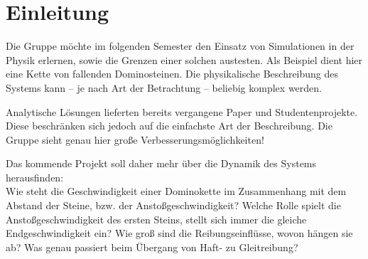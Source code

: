 \section{Einleitung}
Die Gruppe möchte im folgenden Semester den Einsatz von Simulationen in der
Physik erlernen, sowie die Grenzen einer solchen austesten. Als Beispiel dient
hier eine Kette von fallenden Dominosteinen. Die physikalische Beschreibung des
Systems kann – je nach Art der Betrachtung – beliebig komplex werden.

Analytische Lösungen lieferten bereits vergangene Paper und Studentenprojekte.
Diese beschränken sich jedoch auf die einfachste Art der Beschreibung. Die
Gruppe sieht genau hier große Verbesserungsmöglichkeiten!

Das kommende Projekt soll daher mehr über die Dynamik des Systems herausfinden:
\\
Wie steht die Geschwindigkeit einer Dominokette im Zusammenhang mit dem Abstand
der Steine, bzw. der Anstoßgeschwindigkeit? Welche Rolle spielt die
Anstoßgeschwindigkeit des ersten Steins, stellt sich immer die gleiche
Endgeschwindigkeit ein? Wie groß sind die Reibungseinflüsse, wovon hängen sie
ab? Was genau passiert beim Übergang von Haft- zu Gleitreibung?
